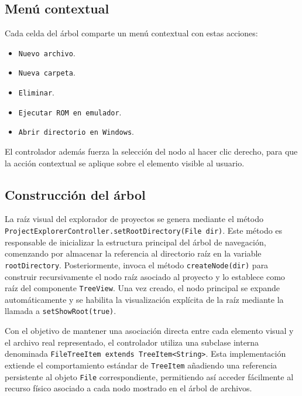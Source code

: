 \documentclass[../../main.tex]{subfiles}
\begin{document}
\clearpage

\subsection{Menú contextual}

Cada celda del árbol comparte un menú contextual con estas acciones:

\begin{itemize}
    \item \lstinline|Nuevo archivo|.
    \item \lstinline|Nueva carpeta|.
    \item \lstinline|Eliminar|.
    \item \lstinline|Ejecutar ROM en emulador|.
    \item \lstinline|Abrir directorio en Windows|.
\end{itemize}

El controlador además fuerza la selección del nodo al hacer clic derecho, para que la acción contextual se aplique sobre el elemento visible al usuario.

\subsection{Construcción del árbol}

La raíz visual del explorador de proyectos se genera mediante el método \lstinline|ProjectExplorerController.setRootDirectory(File dir)|. Este método es responsable de inicializar la estructura principal del árbol de navegación, comenzando por almacenar la referencia al directorio raíz en la variable \lstinline|rootDirectory|. Posteriormente, invoca el método \lstinline|createNode(dir)| para construir recursivamente el nodo raíz asociado al proyecto y lo establece como raíz del componente \lstinline|TreeView|. Una vez creado, el nodo principal se expande automáticamente y se habilita la visualización explícita de la raíz mediante la llamada a \lstinline|setShowRoot(true)|.

Con el objetivo de mantener una asociación directa entre cada elemento visual y el archivo real representado, el controlador utiliza una subclase interna denominada \lstinline|FileTreeItem extends TreeItem<String>|. Esta implementación extiende el comportamiento estándar de \lstinline|TreeItem| añadiendo una referencia persistente al objeto \lstinline|File| correspondiente, permitiendo así acceder fácilmente al recurso físico asociado a cada nodo mostrado en el árbol de archivos.
\end{document}
